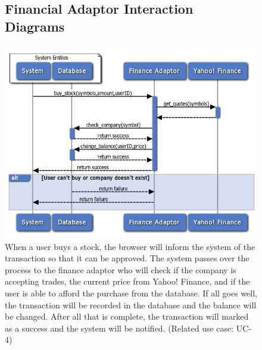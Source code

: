 \begin{figure}
\subsection{Financial Adaptor Interaction Diagrams}
\centering
\includegraphics[width=5.5in]{./Diagrams/InteractionDiagrams/buyingstock.png}
\caption{When a user buys a stock, the browser will inform the system of the transaction so that it can be approved. The system passes over the process to the finance adaptor who will check if the company is accepting trades, the current price from Yahoo! Finance, and if the user is able to afford the purchase from the database. If all goes well, the transaction will be recorded in the database and the balance will be changed. After all that is complete, the transaction will marked as a success and the system will be notified. (Related use case: UC-4)}
\end{figure}

